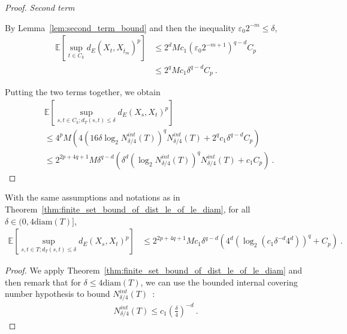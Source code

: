\begin{proof}
\emph{Second term}

By Lemma~\ref{lem:second_term_bound} and then the inequality $\varepsilon_0 2^{-m} \le \delta$,
\begin{align*}
  \mathbb{E} \left[\sup_{t \in C_k} d_E(X_t, X_{\bar{t}_m})^p \right]
  &\le 2^d M c_1 (\varepsilon_0 2^{-m+1})^{q - d} C_p
  \\
  &\le 2^q M c_1 \delta^{q - d} C_p
  \: .
\end{align*}

Putting the two terms together, we obtain
\begin{align*}
  &\mathbb{E}\left[ \sup_{s, t \in C_k; d_T(s, t) \le \delta} d_E(X_s, X_t)^p \right]
  \\
  &\le 4^p M \left(4\left(16 \delta \log_2 N^{int}_{\delta/4}(T) \right)^q  N^{int}_{\delta/4}(T)
    + 2^q c_1 \delta^{q - d} C_p\right)
  \\
  &\le 2^{2p+4q+1} M \delta^{q-d} \left(\delta^d \left(\log_2 N^{int}_{\delta/4}(T) \right)^q  N^{int}_{\delta/4}(T)
    + c_1 C_p\right)
  \: .
\end{align*}
\end{proof}


\begin{corollary}\label{cor:finite_set_bound_of_dist_le_of_le_diam_bis}
  \leanok
With the same assumptions and notations as in Theorem~\ref{thm:finite_set_bound_of_dist_le_of_le_diam}, for all $\delta \in (0, 4\mathrm{diam}(T)]$,
\begin{align*}
  \mathbb{E}\left[ \sup_{s, t \in T; d_T(s, t) \le \delta} d_E(X_s, X_t)^p \right]
  &\le 2^{2p+4q+1} M c_1 \delta^{q-d} \left(4^d \left(\log_2 \left(c_1 \delta^{-d} 4^d \right) \right)^q
    + C_p\right)
  \: .
\end{align*}
\end{corollary}

\begin{proof}\leanok
We apply Theorem~\ref{thm:finite_set_bound_of_dist_le_of_le_diam} and then remark that for $\delta \le 4\mathrm{diam}(T)$, we can use the bounded internal covering number hypothesis to bound $N^{int}_{\delta/4}(T)$~:
\begin{align*}
  N^{int}_{\delta/4}(T) \le c_1 \left(\frac{\delta}{4}\right)^{-d} \: .
\end{align*}
\end{proof}


